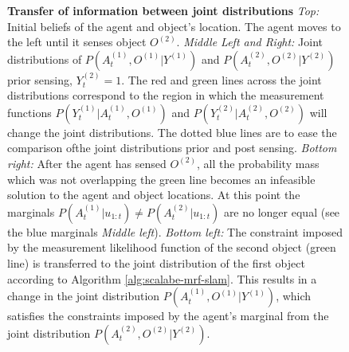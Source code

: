 \begin{figure}
  \centering
  \caption{\textbf{Transfer of information between joint distributions} 
  \textit{Top:} Initial beliefs of the agent and object's location. The agent moves to the left until it senses object $O^{(2)}$.
  \textit{Middle Left and Right:} Joint distributions of 
   $P(A^{(1)}_t,O^{(1)}|Y^{(1)})$ and $P(A^{(2)}_t,O^{(2)}|Y^{(2)})$ prior sensing, $Y_t^{(2)}=1$. The red and green lines across the joint distributions 
   correspond to the region in which the measurement functions $P(Y^{(1)}_{t}|A^{(1)}_t,O^{(1)})$ and $P(Y^{(2)}_{t}|A^{(2)}_t,O^{(2)})$ will change the joint distributions.
  The dotted blue lines are to ease the comparison ofthe joint distributions prior and post sensing.
  \textit{Bottom right:}  After the agent has sensed $O^{(2)}$, all the probability mass which was not overlapping the green line becomes an infeasible
  solution to the agent and object locations. At this point the marginals $P(A^{(1)}_t|u_{1:t}) \not= P(A^{(2)}_t|u_{1:t})$ are no longer equal 
  (see the blue marginals \textit{Middle left}). \textit{Bottom left:} The constraint imposed by the measurement likelihood function of the second object
  (green line) is transferred to the joint distribution of the first object according to Algorithm \ref{alg:scalabe-mrf-slam}.
  This results in a change in the joint distribution  $P(A^{(1)}_t,O^{(1)}|Y^{(1)})$, which satisfies the constraints 
  imposed by the agent's marginal from the joint distribution $P(A^{(2)}_t,O^{(2)}|Y^{(2)})$.}
  \label{fig:transfer_information}
\end{figure}


